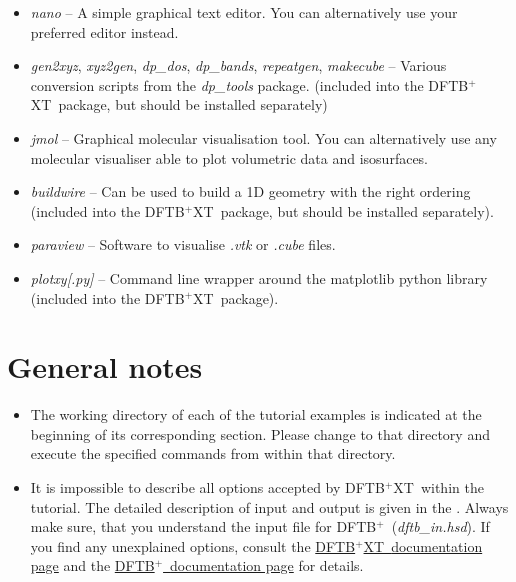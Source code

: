 \documentclass[a4paper,11pt,english]{sphinxmanual}
\newcommand{\dftbp}{\textsf{DFTB$^{\text{+}}$\ }} %
\newcommand{\dftbpxt}{\textsf{DFTB$^{\text{+}}$XT\ }} %
\newcommand{\is}[1]{{\sffamily{#1}}}
\begin{document}
{{\begin{itemize}
\item {} 
\emph{nano} -- A simple graphical text editor. You can alternatively
use your preferred editor instead.

\item {} 
\emph{gen2xyz}, \emph{xyz2gen}, \emph{dp\_dos}, \emph{dp\_bands}, \emph{repeatgen}, \emph{makecube} -- Various conversion scripts from
the \emph{dp\_tools} package. (included into the \dftbpxt package, but should be installed separately)

\item {} 
\emph{jmol} -- Graphical molecular visualisation tool. You can
alternatively use any molecular visualiser able to plot volumetric
data and isosurfaces.

\item {} 
\emph{buildwire} -- Can be used to build a 1D geometry with the right ordering (included into the \dftbpxt package, but should be installed separately).

\item {} 
\emph{paraview} -- Software to visualise \emph{.vtk} or \emph{.cube} files.

\item {} 
\emph{plotxy[.py]} -- Command line wrapper around the matplotlib python library (included into the \dftbpxt package).  

\end{itemize}


\section{General notes}
\label{introduction:general-notes}\begin{itemize}
\item {} 
The working directory of each of the tutorial examples is indicated
at the beginning of its corresponding section. Please change to that
directory and execute the specified commands from within that
directory.

\item {} 
It is impossible to describe all options accepted by \dftbpxt within
the tutorial. The detailed description of input and output is given in the \is{USER MANUAL}.
Always make sure, that you understand the input file
for \dftbp (\emph{dftb\_in.hsd}). If you find any unexplained options,
consult the \href{http://quantranspro.org/dftb+xt/documentation.html}{\dftbpxt documentation page} and the \href{http://www.dftb-plus.info/documentation/}{\dftbp documentation page} for details.


\end{itemize}}}
\end{document}
